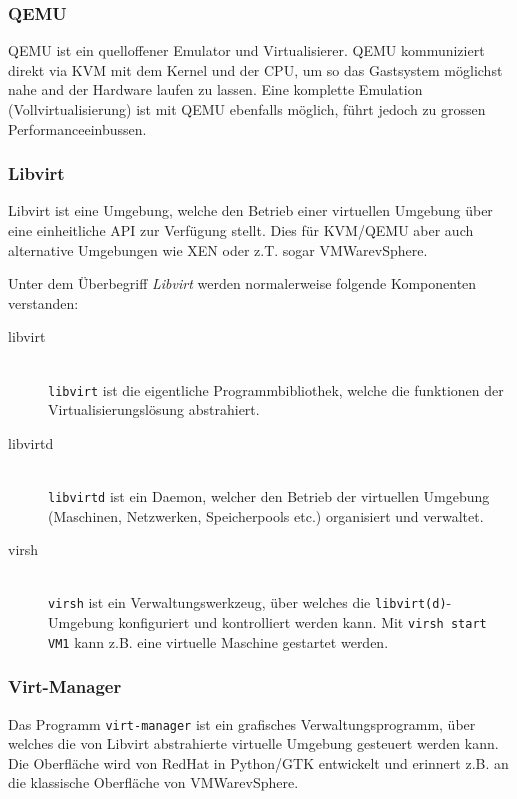 \subsubsection{QEMU}
QEMU ist ein quelloffener Emulator und Virtualisierer. QEMU kommuniziert direkt via KVM mit dem Kernel und der CPU, um so das Gastsystem möglichst nahe and der Hardware laufen zu lassen. Eine komplette Emulation (Vollvirtualisierung) ist mit QEMU ebenfalls möglich, führt jedoch zu grossen Performanceeinbussen.

\subsubsection{Libvirt}

Libvirt ist eine Umgebung, welche den Betrieb einer virtuellen Umgebung über eine einheitliche API zur Verfügung stellt. Dies für KVM/QEMU aber auch alternative Umgebungen wie XEN oder z.T. sogar VMWare\textregistered  vSphere\texttrademark.

Unter dem Überbegriff \emph{Libvirt} werden normalerweise folgende Komponenten verstanden:

\begin{description}
	\item[libvirt] \hfill \\
	\lstinline|libvirt| ist die eigentliche Programmbibliothek, welche die funktionen der Virtualisierungslösung abstrahiert.
	\item[libvirtd] \hfill \\
	\lstinline|libvirtd| ist ein Daemon, welcher den Betrieb der virtuellen Umgebung (Maschinen, Netzwerken, Speicherpools etc.) organisiert und verwaltet.
	\item[virsh] \hfill \\
	\lstinline|virsh| ist ein Verwaltungswerkzeug, über welches die \lstinline|libvirt(d)|-Umgebung konfiguriert und kontrolliert werden kann. Mit \lstinline|virsh start VM1| kann z.B. eine virtuelle Maschine gestartet werden.
\end{description}

\subsubsection{Virt-Manager}

Das Programm \lstinline|virt-manager| ist ein grafisches Verwaltungsprogramm, über welches die von Libvirt abstrahierte virtuelle Umgebung gesteuert werden kann. Die Oberfläche wird von RedHat in Python/GTK entwickelt und erinnert z.B. an die klassische Oberfläche von VMWare\textregistered vSphere\texttrademark.

